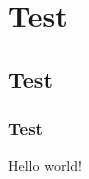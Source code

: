 \documentclass{cs161}
\begin{document}
\section{Test}
\subsection{Test}
\subsubsection{Test}

Hello world!
\end{document}
